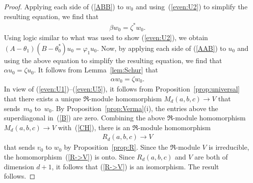\begin{proof}
Applying each side of (\ref{ABB}) to $w_0$ and using~(\ref{even:U2}) to simplify the resulting equation, we find that
\begin{gather}\label{even:U4}
\beta w_0=\zeta^* w_0.
\end{gather}
Using logic similar to what was used to show (\ref{even:U2}), we obtain $(A-\theta_1)(B-\theta_0^*)u_0=\varphi_1 u_0$. Now, by applying each side of (\ref{AAB}) to $u_0$ and using the above equation to simplify the resulting equation, we find that $\alpha u_0=\zeta u_0$. It follows from Lemma~\ref{lem:Schur} that
\begin{gather}\label{even:U5}
\alpha w_0=\zeta w_0.
\end{gather}
In view of (\ref{even:U1})--(\ref{even:U5}), it follows from Proposition~\ref{prop:universal} that there exists a unique $\Re$-module homomorphism $M_d(a,b,c)\to V$ that sends~$m_0$ to~$w_0$. By Proposition~\ref{prop:Verma}(i), the entries above the superdiagonal in~(\ref{B}) are zero.
Combining the above $\Re$-module homomorphism \mbox{$M_d(a,b,c)\to V$} with~(\ref{CH}), there is an $\Re$-module homomorphism
\begin{gather}\label{R->V}
R_d(a,b,c)\to V
\end{gather}
that sends $v_0$ to $w_0$ by Proposition~\ref{prop:R}. Since the $\Re$-module $V$ is irreducible, the homomorphism~(\ref{R->V}) is onto. Since $R_d(a,b,c)$ and $V$ are both of dimension $d+1$, it follows that (\ref{R->V}) is an isomorphism. The result follows.
\end{proof}
